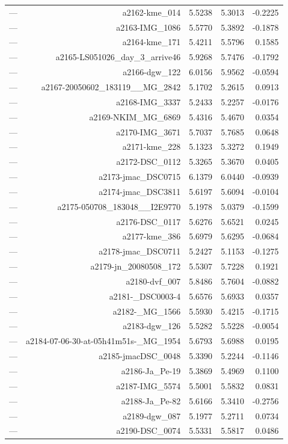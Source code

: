 \begin{table}[htbp]
\begin{tabular}{lrrrr}
— & a2162-kme_014 & 5.5238 & 5.3013 & -0.2225 \\
— & a2163-IMG_1086 & 5.5770 & 5.3892 & -0.1878 \\
— & a2164-kme_171 & 5.4211 & 5.5796 & 0.1585 \\
— & a2165-LS051026_day_3_arrive46 & 5.9268 & 5.7476 & -0.1792 \\
— & a2166-dgw_122 & 6.0156 & 5.9562 & -0.0594 \\
— & a2167-20050602_183119__MG_2842 & 5.1702 & 5.2615 & 0.0913 \\
— & a2168-IMG_3337 & 5.2433 & 5.2257 & -0.0176 \\
— & a2169-NKIM_MG_6869 & 5.4316 & 5.4670 & 0.0354 \\
— & a2170-IMG_3671 & 5.7037 & 5.7685 & 0.0648 \\
— & a2171-kme_228 & 5.1323 & 5.3272 & 0.1949 \\
— & a2172-DSC_0112 & 5.3265 & 5.3670 & 0.0405 \\
— & a2173-jmac_DSC0715 & 6.1379 & 6.0440 & -0.0939 \\
— & a2174-jmac_DSC3811 & 5.6197 & 5.6094 & -0.0104 \\
— & a2175-050708_183048__I2E9770 & 5.1978 & 5.0379 & -0.1599 \\
— & a2176-DSC_0117 & 5.6276 & 5.6521 & 0.0245 \\
— & a2177-kme_386 & 5.6979 & 5.6295 & -0.0684 \\
— & a2178-jmac_DSC0711 & 5.2427 & 5.1153 & -0.1275 \\
— & a2179-jn_20080508_172 & 5.5307 & 5.7228 & 0.1921 \\
— & a2180-dvf_007 & 5.8486 & 5.7604 & -0.0882 \\
— & a2181-_DSC0003-4 & 5.6576 & 5.6933 & 0.0357 \\
— & a2182-_MG_1566 & 5.5930 & 5.4215 & -0.1715 \\
— & a2183-dgw_126 & 5.5282 & 5.5228 & -0.0054 \\
— & a2184-07-06-30-at-05h41m51s-_MG_1954 & 5.6793 & 5.6988 & 0.0195 \\
— & a2185-jmacDSC_0048 & 5.3390 & 5.2244 & -0.1146 \\
— & a2186-Ja_Pe-19 & 5.3869 & 5.4969 & 0.1100 \\
— & a2187-IMG_5574 & 5.5001 & 5.5832 & 0.0831 \\
— & a2188-Ja_Pe-82 & 5.6166 & 5.3410 & -0.2756 \\
— & a2189-dgw_087 & 5.1977 & 5.2711 & 0.0734 \\
— & a2190-DSC_0074 & 5.5331 & 5.5817 & 0.0486 \\

\end{tabular}
\end{table}
